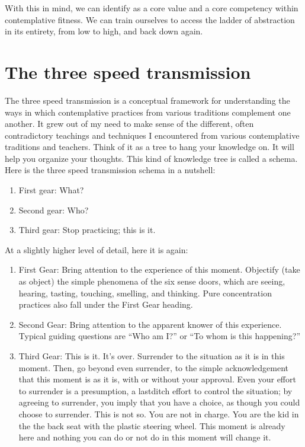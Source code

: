 \documentclass[a5paper,10pt,english]{book}
\begin{document}
\sphinxAtStartPar
With this in mind, we can identify  as a core value and a core
competency within contemplative fitness. We can train ourselves to
access the ladder of abstraction in its entirety, from low to high, and
back down again.


\section{The three speed transmission}
\label{\detokenize{main-2:the-three-speed-transmission}}
\sphinxAtStartPar
The three speed transmission is a conceptual framework for understanding
the ways in which contemplative practices from various traditions
complement one another. It grew out of my need to make sense of the
different, often contradictory teachings and techniques I encountered
from various contemplative traditions and teachers. Think of it as a
tree to hang your knowledge on. It will help you organize your thoughts.
This kind of knowledge tree is called a schema. Here is the three speed
transmission schema in a nutshell:
\begin{enumerate}
%
\item {} 
\sphinxAtStartPar
First gear: What?

\item {} 
\sphinxAtStartPar
Second gear: Who?

\item {} 
\sphinxAtStartPar
Third gear: Stop practicing; this is it.

\end{enumerate}

\sphinxAtStartPar
At a slightly higher level of detail, here it is again:
\begin{enumerate}
%
\item {} 
\sphinxAtStartPar
First Gear: Bring attention to the experience of this moment.
Objectify (take as object) the simple phenomena of the six sense
doors, which are seeing, hearing, tasting, touching, smelling, and
thinking. Pure concentration practices also fall under the First Gear
heading.

\item {} 
\sphinxAtStartPar
Second Gear: Bring attention to the apparent knower of this
experience. Typical guiding questions are “Who am I?” or “To whom is
this happening?”

\item {} 
\sphinxAtStartPar
Third Gear: This is it. It’s over. Surrender to the situation as it
is in this moment. Then, go beyond even surrender, to the simple
acknowledgement that this moment is as it is, with or without your
approval. Even your effort to surrender is a presumption, a
last\sphinxhyphen{}ditch effort to control the situation; by agreeing to surrender,
you imply that you have a choice, as though you could choose  to
surrender. This is not so. You are not in charge. You are the kid in
the the back seat with the plastic steering wheel. This moment is
already here and nothing you can do or not do in this moment will
change it.

\end{enumerate}
\end{document}
